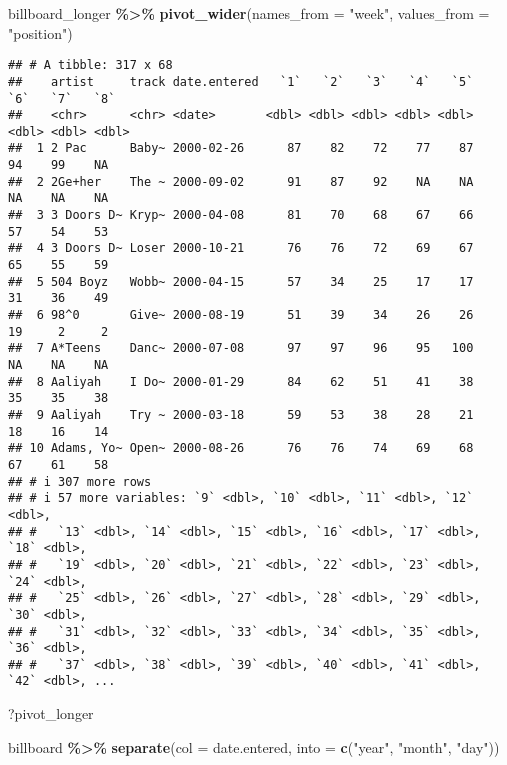 \documentclass[
]{article}
\newenvironment{Shaded}{\begin{snugshade}}{\end{snugshade}}
\newcommand{\AttributeTok}[1]{\textcolor[rgb]{0.13,0.29,0.53}{#1}}
\newcommand{\FunctionTok}[1]{\textcolor[rgb]{0.13,0.29,0.53}{\textbf{#1}}}
\newcommand{\NormalTok}[1]{#1}
\newcommand{\SpecialCharTok}[1]{\textcolor[rgb]{0.81,0.36,0.00}{\textbf{#1}}}
\newcommand{\StringTok}[1]{\textcolor[rgb]{0.31,0.60,0.02}{#1}}
\begin{document}
\begin{Shaded}
\begin{Highlighting}[]
\NormalTok{billboard\_longer }\SpecialCharTok{\%\textgreater{}\%} 
  \FunctionTok{pivot\_wider}\NormalTok{(}\AttributeTok{names\_from =} \StringTok{"week"}\NormalTok{, }
              \AttributeTok{values\_from =} \StringTok{"position"}\NormalTok{)}
\end{Highlighting}
\end{Shaded}

\begin{verbatim}
## # A tibble: 317 x 68
##    artist     track date.entered   `1`   `2`   `3`   `4`   `5`   `6`   `7`   `8`
##    <chr>      <chr> <date>       <dbl> <dbl> <dbl> <dbl> <dbl> <dbl> <dbl> <dbl>
##  1 2 Pac      Baby~ 2000-02-26      87    82    72    77    87    94    99    NA
##  2 2Ge+her    The ~ 2000-09-02      91    87    92    NA    NA    NA    NA    NA
##  3 3 Doors D~ Kryp~ 2000-04-08      81    70    68    67    66    57    54    53
##  4 3 Doors D~ Loser 2000-10-21      76    76    72    69    67    65    55    59
##  5 504 Boyz   Wobb~ 2000-04-15      57    34    25    17    17    31    36    49
##  6 98^0       Give~ 2000-08-19      51    39    34    26    26    19     2     2
##  7 A*Teens    Danc~ 2000-07-08      97    97    96    95   100    NA    NA    NA
##  8 Aaliyah    I Do~ 2000-01-29      84    62    51    41    38    35    35    38
##  9 Aaliyah    Try ~ 2000-03-18      59    53    38    28    21    18    16    14
## 10 Adams, Yo~ Open~ 2000-08-26      76    76    74    69    68    67    61    58
## # i 307 more rows
## # i 57 more variables: `9` <dbl>, `10` <dbl>, `11` <dbl>, `12` <dbl>,
## #   `13` <dbl>, `14` <dbl>, `15` <dbl>, `16` <dbl>, `17` <dbl>, `18` <dbl>,
## #   `19` <dbl>, `20` <dbl>, `21` <dbl>, `22` <dbl>, `23` <dbl>, `24` <dbl>,
## #   `25` <dbl>, `26` <dbl>, `27` <dbl>, `28` <dbl>, `29` <dbl>, `30` <dbl>,
## #   `31` <dbl>, `32` <dbl>, `33` <dbl>, `34` <dbl>, `35` <dbl>, `36` <dbl>,
## #   `37` <dbl>, `38` <dbl>, `39` <dbl>, `40` <dbl>, `41` <dbl>, `42` <dbl>, ...
\end{verbatim}

\begin{Shaded}
\begin{Highlighting}[]
\NormalTok{?pivot\_longer}
\end{Highlighting}
\end{Shaded}

\begin{Shaded}
\begin{Highlighting}[]
\NormalTok{billboard }\SpecialCharTok{\%\textgreater{}\%} 
  \FunctionTok{separate}\NormalTok{(}\AttributeTok{col =}\NormalTok{ date.entered,}
           \AttributeTok{into =} \FunctionTok{c}\NormalTok{(}\StringTok{"year"}\NormalTok{, }\StringTok{"month"}\NormalTok{, }\StringTok{"day"}\NormalTok{))}
\end{Highlighting}
\end{Shaded}
\end{document}

